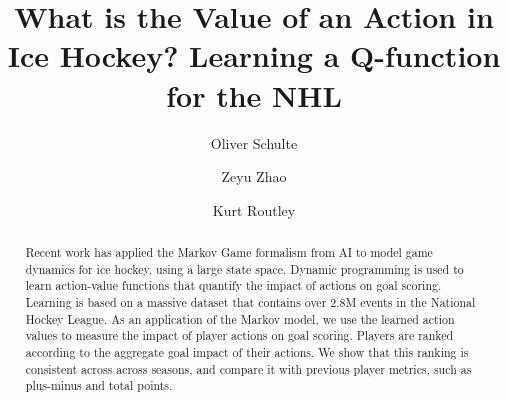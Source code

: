 \documentclass[runningheads,a4paper]{llncs}
\begin{document}
	
	\mainmatter  %
	
	\title{What is the Value of an Action in Ice Hockey? Learning a Q-function for the NHL}
	
	
		\author{Oliver Schulte \and Zeyu Zhao \and Kurt Routley}
	
	
	
	\maketitle
	
	
	\begin{abstract}
			Recent work has applied the Markov Game formalism from AI to model game dynamics for ice hockey, using a large state space. Dynamic programming is used to learn action-value functions that quantify the impact of actions on goal scoring. Learning is based on a massive dataset that contains over 2.8M events in the National Hockey League. As an application of the Markov model, we use the learned action values to measure the impact of player actions on goal scoring. Players are ranked according to the aggregate goal impact of their actions. We show that this ranking is consistent across across seasons, and compare it with previous player metrics, such as plus-minus and total points.
	\end{abstract}
	
\end{document}
